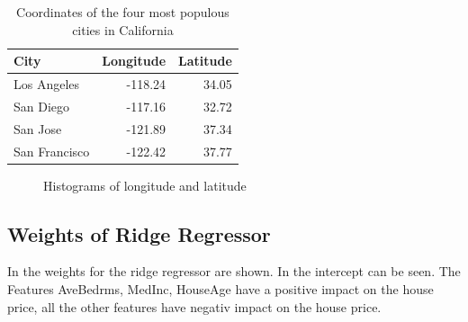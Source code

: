 \documentclass[12pt,a4paper]{scrartcl}
\begin{document}
	\begin{table}[H]
		\centering
		\begin{tabular}{|l|r|r|} \hline
			City & Longitude & Latitude \\ \hline
			Los Angeles & -118.24 & 34.05 \\ \hline
			San Diego & -117.16 & 32.72 \\ \hline
			San Jose & -121.89 & 37.34 \\ \hline
			San Francisco & -122.42 & 37.77 \\ \hline
		\end{tabular}
		\caption{Coordinates of the four most populous cities in California}
		\label{tab:ex1_3_coords_cal}
	\end{table}


	\begin{figure}[H]
		\centering	
		\caption{Histograms of longitude and latitude}
		\label{fig:ex1_3_hist_lon_lat}
	\end{figure}
	
	\subsection*{Weights of Ridge Regressor}
	
	In  the weights for the ridge regressor are shown. In  the intercept can be seen.
	The Features AveBedrms, MedInc, HouseAge have a positive impact on the house price, all the other features have negativ impact on the house price.
	
\end{document}

